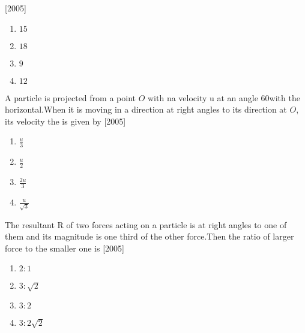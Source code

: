 \hfill{[2005]}
\begin{enumerate}
\item $15$
\item $18$
\item $9$
\item $12$
\end{enumerate}
\item A particle is projected from a point $O$ with na velocity u at an angle 60\degree with the horizontal.When it is moving in a direction at right angles to its direction at $O$, its velocity the is given by
\hfill{[2005]}
\begin{enumerate}
\item $\frac{u}{3}$
\item $\frac{u}{2}$
\item $\frac{2u}{3}$
\item $\frac{u}{\sqrt{3}}$
\end{enumerate}
\item The resultant R of two forces acting on a particle is at right angles to one of them and its magnitude is one third of the other force.Then the ratio of larger force to the smaller one is 
\hfill{[2005]}
\begin{enumerate}
\item $ 2\colon 1$
\item $ 3\colon \sqrt{2}$
\item $ 3\colon 2$
\item $ 3\colon 2\sqrt{2}$
\end{enumerate}
